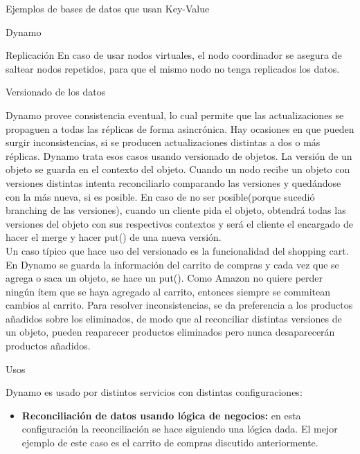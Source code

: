 \begin{section}{Ejemplos de bases de datos que usan Key-Value}
\begin{subsection}{Dynamo}
\begin{subsubsection}{Replicación}
En caso de usar nodos virtuales, el nodo coordinador se asegura de saltear nodos repetidos, para que el mismo nodo no tenga replicados los datos. \\

\end{subsubsection}

\begin{subsubsection}{Versionado de los datos}

Dynamo provee consistencia eventual, lo cual permite que las actualizaciones se propaguen a todas las réplicas de forma asincrónica. Hay ocasiones en que pueden surgir inconsistencias, si se producen actualizaciones distintas a dos o más réplicas. Dynamo trata esos casos usando versionado de objetos. La versión de un objeto se guarda en el contexto del objeto. Cuando un nodo recibe un objeto con versiones distintas intenta reconciliarlo comparando las versiones y quedándose con la más nueva, si es posible. En caso de no ser posible(porque sucedió branching de las versiones), cuando un cliente pida el objeto, obtendrá todas las versiones del objeto con sus respectivos contextos y será el cliente el encargado de hacer el merge y hacer put() de una nueva versión.\\

	Un caso típico que hace uso del versionado es la funcionalidad del shopping cart. En Dynamo se guarda la información del carrito de compras y cada vez que se agrega o saca un objeto, se hace un put(). Como Amazon no quiere perder ningún ítem que se haya agregado al carrito, entonces siempre se commitean cambios al carrito. Para resolver inconsistencias, se da preferencia a los productos añadidos sobre los eliminados, de modo que al reconciliar distintas versiones de un objeto, pueden reaparecer productos eliminados pero nunca desaparecerán productos añadidos.\\
	
\end{subsubsection}

\begin{subsubsection}{Usos}

	Dynamo es usado por distintos servicios con distintas configuraciones:\\
\begin{itemize}

\item \textbf{Reconciliación de datos usando lógica de negocios:} en esta configuración la reconciliación se hace siguiendo una lógica dada. El mejor ejemplo de este caso es el carrito de compras discutido anteriormente.\\


\end{itemize}
\end{subsubsection}
\end{subsection}
\end{section}
